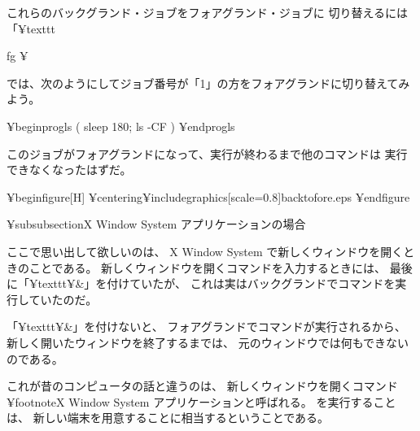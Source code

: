 これらのバックグランド・ジョブをフォアグランド・ジョブに
切り替えるには「¥texttt{fg  ¥%

では、次のようにしてジョブ番号が「1」の方をフォアグランドに切り替えてみよう。

¥begin{progls}
( sleep 180; ls -CF )
¥end{progls}

このジョブがフォアグランドになって、実行が終わるまで他のコマンドは
実行できなくなったはずだ。

¥begin{figure}[H]
¥centering{¥includegraphics[scale=0.8]{backtofore.eps}}
¥end{figure}

¥subsubsection{X Window System アプリケーションの場合}

ここで思い出して欲しいのは、
 X Window System で新しくウィンドウを開くときのことである。
新しくウィンドウを開くコマンドを入力するときには、
最後に「¥texttt{¥&}」を付けていたが、
これは実はバックグランドでコマンドを実行していたのだ。

「¥texttt{¥&}」を付けないと、
フォアグランドでコマンドが実行されるから、
新しく開いたウィンドウを終了するまでは、
元のウィンドウでは何もできないのである。

これが昔のコンピュータの話と違うのは、
新しくウィンドウを開くコマンド
¥footnote{X Window System アプリケーションと呼ばれる。}
を実行することは、
新しい端末を用意することに相当するということである。

}

